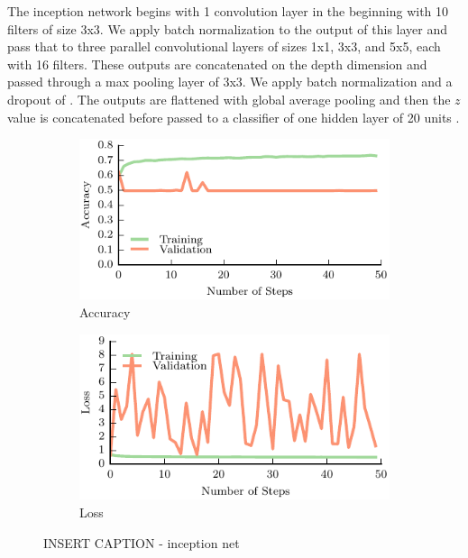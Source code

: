 The inception network begins with 1 convolution layer in the beginning with 10 filters of size 3x3. 
We apply batch normalization to the output of this layer and pass that to three parallel convolutional layers of sizes 1x1, 3x3, and 5x5, each with 16 filters. 
These outputs are concatenated on the depth dimension and passed through a max pooling layer of 3x3.
We apply batch normalization and a dropout of . 
The outputs are flattened with global average pooling and then the $z$ value is concatenated before passed to a classifier of one hidden layer of 20 units . 


\begin{figure}[t!]
    \centering
    \begin{subfigure}[t]{0.49\textwidth}
        \includegraphics[width=0.9\columnwidth]{figs/inception_accuracy.pdf}
        \caption{Accuracy} \label{fig:accuracy}
        \end{subfigure}
    \begin{subfigure}[t]{0.49\textwidth}
        \includegraphics[width=0.9\columnwidth]{figs/inception_loss.pdf}
        \caption{Loss} \label{fig:loss}
    \end{subfigure}
\caption{INSERT CAPTION - inception net} \label{fig:inceptionnet_results}
\end{figure}


